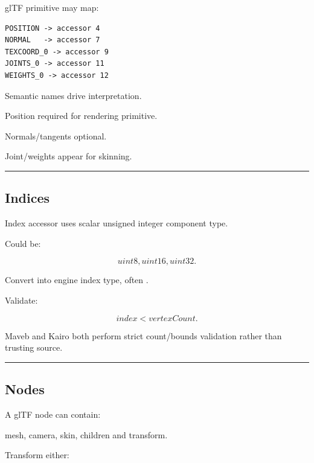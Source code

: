 \hypertarget{04-visual-computing-ii-ch041-primitive-attributes}{}

glTF primitive may map:

\begin{verbatim}
POSITION -> accessor 4
NORMAL   -> accessor 7
TEXCOORD_0 -> accessor 9
JOINTS_0 -> accessor 11
WEIGHTS_0 -> accessor 12
\end{verbatim}

Semantic names drive interpretation.

Position required for rendering primitive.

Normals/tangents optional.

Joint/weights appear for skinning.

\begin{center}\rule{0.5\linewidth}{0.5pt}\end{center}

\subsection{Indices}\label{04-visual-computing-ii-ch041-indices}

\hypertarget{04-visual-computing-ii-ch041-indices}{}

Index accessor uses scalar unsigned integer component type.

Could be:

\[
uint8,uint16,uint32.
\]

Convert into engine index type, often .

Validate:

\[
index<vertexCount.
\]

Maveb and Kairo both perform strict count/bounds validation rather than trusting source.

\begin{center}\rule{0.5\linewidth}{0.5pt}\end{center}

\subsection{Nodes}\label{04-visual-computing-ii-ch041-nodes}

\hypertarget{04-visual-computing-ii-ch041-nodes}{}

A glTF node can contain:

mesh, camera, skin, children and transform.

Transform either:

